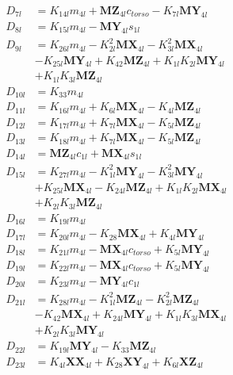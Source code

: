 \begin{multicols}{2}
\begin{align}
D_{7l} &= K_{14l}m_{4l} + \mathbf{MZ}_{4l}c_{torso} - K_{7l}\mathbf{MY}_{4l} \nonumber \\
D_{8l} &= K_{15l}m_{4l} - \mathbf{MY}_{4l}s_{1l} \nonumber \\
D_{9l} &= K_{26l}m_{4l} - K_{2l}^2\mathbf{MX}_{4l} - K_{3l}^2\mathbf{MX}_{4l}  \nonumber \\
&- K_{25l}\mathbf{MY}_{4l} + K_{42}\mathbf{MZ}_{4l} + K_{1l}K_{2l}\mathbf{MY}_{4l}  \nonumber \\
&+ K_{1l}K_{3l}\mathbf{MZ}_{4l} \nonumber \\
D_{10l} &= K_{33}m_{4l} \nonumber \\
D_{11l} &= K_{16l}m_{4l} + K_{6l}\mathbf{MX}_{4l} - K_{4l}\mathbf{MZ}_{4l} \nonumber \\
D_{12l} &= K_{17l}m_{4l} + K_{7l}\mathbf{MX}_{4l} - K_{5l}\mathbf{MZ}_{4l} \nonumber \\
D_{13l} &= K_{18l}m_{4l} + K_{7l}\mathbf{MX}_{4l} - K_{5l}\mathbf{MZ}_{4l} \nonumber \\
D_{14l} &= \mathbf{MZ}_{4l}c_{1l} + \mathbf{MX}_{4l}s_{1l} \nonumber \\
D_{15l} &= K_{27l}m_{4l} - K_{1l}^2\mathbf{MY}_{4l} - K_{3l}^2\mathbf{MY}_{4l}  \nonumber \\
&+ K_{25l}\mathbf{MX}_{4l} - K_{24l}\mathbf{MZ}_{4l} + K_{1l}K_{2l}\mathbf{MX}_{4l}  \nonumber \\
&+ K_{2l}K_{3l}\mathbf{MZ}_{4l} \nonumber \\
D_{16l} &= K_{19l}m_{4l} \nonumber \\
D_{17l} &= K_{20l}m_{4l} - K_{28}\mathbf{MX}_{4l} + K_{4l}\mathbf{MY}_{4l} \nonumber \\
D_{18l} &= K_{21l}m_{4l} - \mathbf{MX}_{4l}c_{torso} + K_{5l}\mathbf{MY}_{4l} \nonumber \\
D_{19l} &= K_{22l}m_{4l} - \mathbf{MX}_{4l}c_{torso} + K_{5l}\mathbf{MY}_{4l} \nonumber \\
D_{20l} &= K_{23l}m_{4l} - \mathbf{MY}_{4l}c_{1l} \nonumber \\
D_{21l} &= K_{28l}m_{4l} - K_{1l}^2\mathbf{MZ}_{4l} - K_{2l}^2\mathbf{MZ}_{4l}  \nonumber \\
&- K_{42}\mathbf{MX}_{4l} + K_{24l}\mathbf{MY}_{4l} + K_{1l}K_{3l}\mathbf{MX}_{4l}  \nonumber \\
&+ K_{2l}K_{3l}\mathbf{MY}_{4l} \nonumber \\
D_{22l} &= K_{19l}\mathbf{MY}_{4l} - K_{33}\mathbf{MZ}_{4l} \nonumber \\
D_{23l} &= K_{4l}\mathbf{XX}_{4l} + K_{28}\mathbf{XY}_{4l} + K_{6l}\mathbf{XZ}_{4l}  \nonumber \\

\end{align}
\end{multicols}
